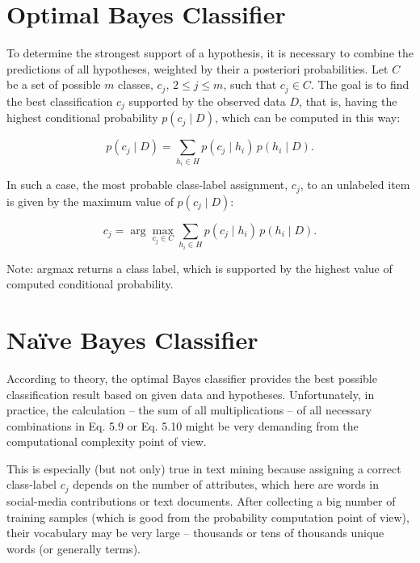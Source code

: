\section{Optimal Bayes Classifier}

To determine the strongest support of a hypothesis, it is necessary to combine
the predictions of all hypotheses, weighted by their a posteriori probabilities. Let
$C$ be a set of possible $m$ classes, $c_j$, $2 \le j \le m$, such that $c_j \in C$. The goal is to
find the best classification $c_j$ supported by the observed data $D$, that is, having
the highest conditional probability $p(c_j \mid D)$, which can be computed in this way:

\begin{equation}
p(c_j \mid D) = \sum_{h_i \in H} p(c_j \mid h_i) \, p(h_i \mid D). \label{eq:5.9}
\end{equation}

In such a case, the most probable class-label assignment, $c_j$,
to an unlabeled item is given by the maximum value of $p(c_j \mid D)$:

\begin{equation}
c_j = \arg\max_{c_j \in C} \sum_{h_i \in H} p(c_j \mid h_i) \, p(h_i \mid D). \label{eq:5.10}
\end{equation}

Note: argmax returns a class label, which is supported by the highest value
of computed conditional probability.

\section{Na\"ive Bayes Classifier}

According to theory, the optimal Bayes classifier provides the best possible classification result based on given data and hypotheses. Unfortunately, in practice,
the calculation – the sum of all multiplications – of all necessary combinations in
Eq. 5.9 or Eq. 5.10 might be very demanding from the computational complexity
point of view.

This is especially (but not only) true in text mining because assigning a correct class-label $c_j$ depends on the number of attributes, which here are words
in social-media contributions or text documents. After collecting a big number
of training samples (which is good from the probability computation point of
view), their vocabulary may be very large – thousands or tens of thousands unique
words (or generally terms).

